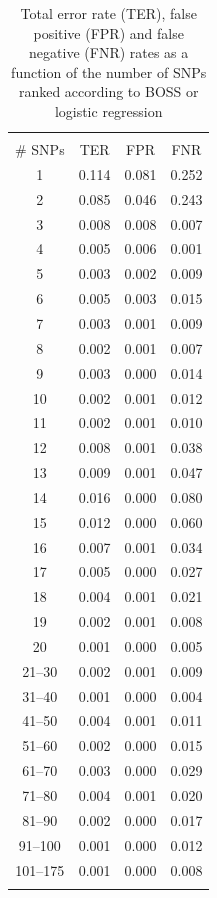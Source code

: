 \begin{table}
\centering
\caption{Total error rate (TER), false positive (FPR) and false negative
  (FNR) rates as a function of the number of SNPs ranked according to
  BOSS or logistic regression}
\label{tab:error}       %
\begin{tabular}{cccc}
\hline\noalign{\smallskip}
\multicolumn{4}{c}{BOSS}\\
\noalign{\smallskip}\hline\noalign{\smallskip}
\# SNPs & TER & FPR & FNR \\
\noalign{\smallskip}\hline\noalign{\smallskip}
1 & 0.114 & 0.081 & 0.252 \\
2 & 0.085 & 0.046 & 0.243 \\
3 & 0.008 & 0.008 &  0.007 \\
4 & 0.005 & 0.006 &  0.001 \\
5 & 0.003 & 0.002 &  0.009 \\
6 & 0.005 & 0.003&  0.015\\
7 & 0.003 & 0.001 &  0.009\\
8 & 0.002 & 0.001 &  0.007\\
9 & 0.003 & 0.000 &  0.014\\
10 & 0.002 & 0.001 &  0.012\\
11 & 0.002 & 0.001 &  0.010\\
12 & 0.008 & 0.001 &  0.038\\
13 & 0.009 & 0.001 &  0.047\\
14 & 0.016 & 0.000 &  0.080\\
15 & 0.012 & 0.000 &  0.060\\
16 & 0.007 & 0.001 &  0.034\\
17 & 0.005 & 0.000 &  0.027\\
18 & 0.004 & 0.001 &  0.021\\
19 & 0.002 & 0.001 &  0.008\\
20 & 0.001 & 0.000 &  0.005\\
21--30 & 0.002  & 0.001 & 0.009\\
31--40 & 0.001 & 0.000 & 0.004\\
41--50 & 0.004 & 0.001 & 0.011\\
51--60 & 0.002 & 0.000 & 0.015\\
61--70 & 0.003 & 0.000 & 0.029\\
71--80 & 0.004 & 0.001 & 0.020\\
81--90 & 0.002 & 0.000 & 0.017\\
91--100 & 0.001 & 0.000 & 0.012\\
101--175 & 0.001 &  0.000 & 0.008\\
\noalign{\smallskip}\hline
\end{tabular}
\end{table}

